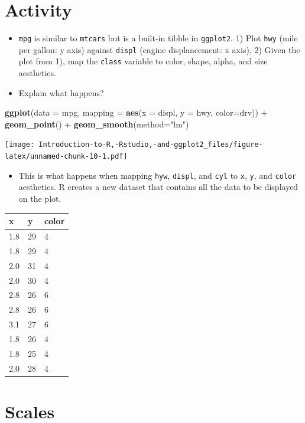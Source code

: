 \documentclass[]{book}
\newenvironment{Shaded}{\begin{snugshade}}{\end{snugshade}}
\newcommand{\KeywordTok}[1]{\textcolor[rgb]{0.13,0.29,0.53}{\textbf{{#1}}}}
\newcommand{\DataTypeTok}[1]{\textcolor[rgb]{0.13,0.29,0.53}{{#1}}}
\newcommand{\StringTok}[1]{\textcolor[rgb]{0.31,0.60,0.02}{{#1}}}
\newcommand{\NormalTok}[1]{{#1}}
\providecommand{\tightlist}{%
  \setlength{\itemsep}{0pt}\setlength{\parskip}{0pt}}
\begin{document}
\section{Activity}\label{activity-1}

\begin{itemize}
\item
  \texttt{mpg} is similar to \texttt{mtcars} but is a built-in tibble in
  \texttt{ggplot2}. 1) Plot \texttt{hwy} (mile per gallon: y axis)
  against \texttt{displ} (engine displancement: x axis), 2) Given the
  plot from 1), map the \texttt{class} variable to color, shape, alpha,
  and size aesthetics.
\item
  Explain what happens?
\end{itemize}

\begin{Shaded}
\begin{Highlighting}[]
\KeywordTok{ggplot}\NormalTok{(}\DataTypeTok{data =} \NormalTok{mpg, }\DataTypeTok{mapping =} \KeywordTok{aes}\NormalTok{(}\DataTypeTok{x =} \NormalTok{displ, }\DataTypeTok{y =} \NormalTok{hwy, }\DataTypeTok{color=}\NormalTok{drv)) +}\StringTok{ }\KeywordTok{geom_point}\NormalTok{() +}\StringTok{ }\KeywordTok{geom_smooth}\NormalTok{(}\DataTypeTok{method=}\StringTok{"lm"}\NormalTok{)}
\end{Highlighting}
\end{Shaded}

\texttt{[image: Introduction-to-R,-Rstudio,-and-ggplot2\_files/figure-latex/unnamed-chunk-10-1.pdf]}

\begin{itemize}
\tightlist
\item
  This is what happens when mapping \texttt{hyw}, \texttt{displ}, and
  \texttt{cyl} to \texttt{x}, \texttt{y}, and \texttt{color} aesthetics.
  R creates a new dataset that contains all the data to be displayed on
  the plot.
\end{itemize}

\begin{longtable}[]{@{}lll@{}}
\toprule
x & y & color\tabularnewline
\midrule
\endhead
1.8 & 29 & 4\tabularnewline
1.8 & 29 & 4\tabularnewline
2.0 & 31 & 4\tabularnewline
2.0 & 30 & 4\tabularnewline
2.8 & 26 & 6\tabularnewline
2.8 & 26 & 6\tabularnewline
3.1 & 27 & 6\tabularnewline
1.8 & 26 & 4\tabularnewline
1.8 & 25 & 4\tabularnewline
2.0 & 28 & 4\tabularnewline
\bottomrule
\end{longtable}

\section{Scales}\label{scales}
\end{document}
